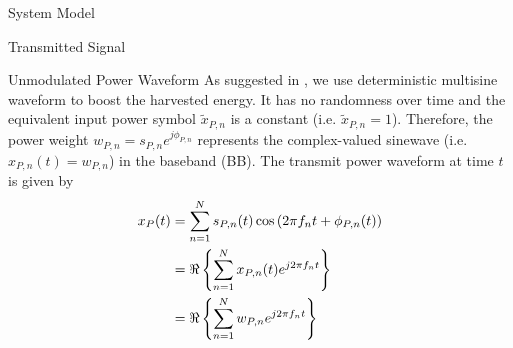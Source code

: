 \documentclass{IEEEtran}
\begin{document}
\begin{section} {System Model}
\begin{subsection}	{Transmitted Signal}
		\begin{subsubsection} {Unmodulated Power Waveform}
			As suggested in \cite{Clerckx2018b,Clerckx2016a}, we use deterministic multisine waveform to boost the harvested energy. It has no randomness over time and the equivalent input power symbol $\tilde{x}_{P,n}$ is a constant (i.e. $\tilde{x}_{P,n} = 1$). Therefore, the power weight $w_{P,n} = s_{P,n} e^{j\phi_{P,n}}$ represents the complex-valued sinewave (i.e. $x_{P,n}(t) = w_{P,n}$) in the baseband (BB). The transmit power waveform at time $t$ is given by
			\begin{equation}	\label{eq:x{P}(t)}
				\begin{split}
					x_{P}(t)
					&= \sum_{n=1}^{N} s_{P,n}(t) \cos \left( 2 \pi f_n t + \phi_{P,n}(t) \right)	\\
					&= \Re \left\{ \sum_{n=1}^{N} x_{P,n}(t) e^{j2 \pi f_n t} \right\}	\\
					&= \Re \left\{ \sum_{n=1}^{N} w_{P,n} e^{j2 \pi f_n t} \right\}
				\end{split}
			\end{equation}
		\end{subsubsection}


\end{subsection}
\end{section}
\end{document}
